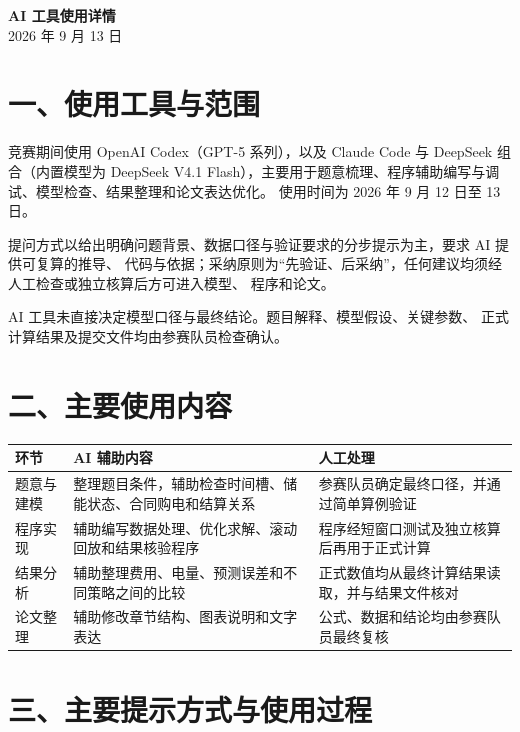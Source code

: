 \documentclass[zihao=-4,a4paper]{ctexart}
\begin{document}
\begin{center}
  {\Large\bfseries AI 工具使用详情}\\[4pt]
  {\small 2026 年 9 月 13 日}
\end{center}

\section*{一、使用工具与范围}

竞赛期间使用 OpenAI Codex（GPT-5 系列），以及 Claude Code 与 DeepSeek 组合（内置模型为
DeepSeek V4.1 Flash），主要用于题意梳理、程序辅助编写与调试、模型检查、结果整理和论文表达优化。
使用时间为 2026 年 9 月 12 日至 13 日。

提问方式以给出明确问题背景、数据口径与验证要求的分步提示为主，要求 AI 提供可复算的推导、
代码与依据；采纳原则为“先验证、后采纳”，任何建议均须经人工检查或独立核算后方可进入模型、
程序和论文。

AI 工具未直接决定模型口径与最终结论。题目解释、模型假设、关键参数、
正式计算结果及提交文件均由参赛队员检查确认。

\section*{二、主要使用内容}

\begin{table}[H]
\centering
\small
\begin{tabular}{p{2.4cm} p{6.0cm} p{6.0cm}}
\toprule
环节 & AI 辅助内容 & 人工处理 \\
\midrule

题意与建模 &
整理题目条件，辅助检查时间槽、储能状态、合同购电和结算关系 &
参赛队员确定最终口径，并通过简单算例验证 \\

程序实现 &
辅助编写数据处理、优化求解、滚动回放和结果核验程序 &
程序经短窗口测试及独立核算后再用于正式计算 \\

结果分析 &
辅助整理费用、电量、预测误差和不同策略之间的比较 &
正式数值均从最终计算结果读取，并与结果文件核对 \\

论文整理 &
辅助修改章节结构、图表说明和文字表达 &
公式、数据和结论均由参赛队员最终复核 \\

\bottomrule
\end{tabular}
\end{table}

\section*{三、主要提示方式与使用过程}
\end{document}
